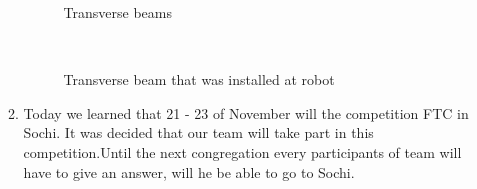 \begin{enumerate}
\begin{enumerate}
      \begin{figure}[H]
      	\begin{minipage}[h]{0.47\linewidth}
      		\caption{Transverse beams}  
      	\end{minipage}
      	\hfill
      	\begin{minipage}[h]{0.47\linewidth}
      		\caption{Transverse beam that was installed at robot}
      	\end{minipage}
      \end{figure}
      
      \item Today we learned that 21 - 23 of November will the competition FTC in Sochi. It was decided that our team will take part in this competition.Until the next congregation every participants of team  will have to give an answer, will he be able to go to Sochi.
      

\end{enumerate}
\end{enumerate}
